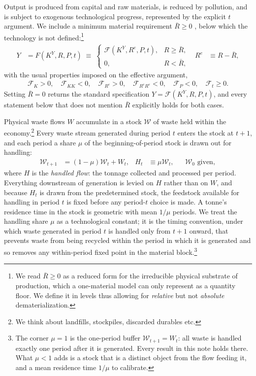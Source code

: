  Output is produced from capital and raw materials, is reduced by pollution, and is subject to exogenous technological progress, represented by the explicit $t$ argument. We include a minimum material requirement $\bar{R}\geq0$ , below which the technology is not defined:\footnote{We read $\bar{R}\geq0$ as a reduced form for the irreducible physical substrate of production, which a one-material model can only represent as a quantity floor. We define it in levels thus allowing for \emph{relative} but not \emph{absolute} dematerialization.}
\begin{align}
Y &= F\left(K^Y,R,P,t\right)\;\equiv\;
\begin{cases}
\mathcal F\left(K^Y,R^{e},P,t\right), & R\ge\bar R,
\\[0.2em]
0, & R<\bar R,
\end{cases}
&
R^{e} &\equiv R-\bar R,
\label{eq:sp:setup:output}
\end{align}
with the usual properties imposed on the effective argument,
\begin{align}
\mathcal F_K>0,\quad \mathcal F_{KK}<0,\quad \mathcal F_{R^e}>0,\quad \mathcal F_{R^eR^e}<0,\quad \mathcal F_P<0,\quad \mathcal F_t\ge0 .
\label{eq:sp:setup:output-props}
\end{align}
Setting $\bar R=0$ returns the standard specification $Y=\mathcal F\left(K^Y,R,P,t\right)$, and every statement below that does not mention $\bar R$ explicitly holds for both cases.


Physical waste flows $W$ accumulate in a stock $\mathcal{W}$ of waste held within the economy.\footnote{We think about landfills, stockpiles, discarded durables etc.} Every waste stream generated during period $t$ enters the stock at $t+1$, and each period a share $\mu$ of the beginning-of-period stock is drawn out for handling:
\begin{align}
\mathcal W_{t+1} &= \left(1-\mu\right)\mathcal W_t+W_t,
&
H_t &\equiv \mu\mathcal W_t,
&&
\mathcal W_0\text{ given},
\label{eq:sp:setup:wastestock}
\end{align}
where $H$ is the \emph{handled flow}: the tonnage collected and processed per period. Everything downstream of generation is levied on $H$ rather than on $W$, and because $H_t$ is drawn from the predetermined stock, the feedstock available for handling in period $t$ is fixed before any period-$t$ choice is made. A tonne's residence time in the stock is geometric with mean $1/\mu$ periods. We treat the handling share $\mu$ as a technological constant; it is the timing convention, under which waste generated in period $t$ is handled only from $t+1$ onward, that prevents waste from being recycled within the period in which it is generated and so removes any within-period fixed point in the material block.\footnote{The corner $\mu=1$ is the one-period buffer $\mathcal W_{t+1}=W_t$: all waste is handled exactly one period after it is generated. Every result in this note holds there. What $\mu<1$ adds is a stock that is a distinct object from the flow feeding it, and a mean residence time $1/\mu$ to calibrate.}


